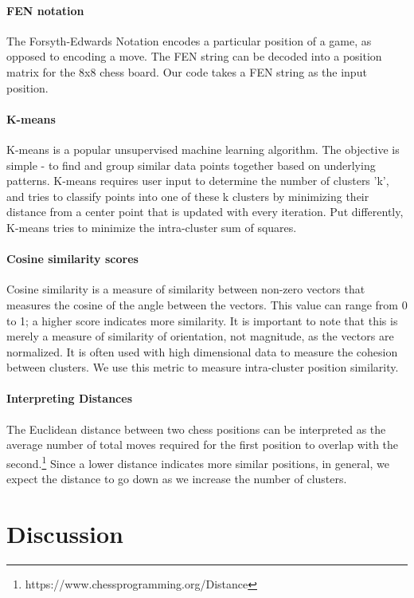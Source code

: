 \documentclass{article}
\begin{document}
\paragraph{FEN notation} The Forsyth-Edwards Notation encodes a particular position of a game, as opposed to encoding a move. The FEN string can be decoded into a position matrix for the 8x8 chess board. Our code takes a FEN string as the input position.

\paragraph{K-means} K-means is a popular unsupervised machine learning algorithm. The objective is simple - to find and group similar data points together based on underlying patterns. K-means requires user input to determine the number of clusters 'k', and tries to classify points into one of these k clusters by minimizing their distance from a center point that is updated with every iteration. Put differently, K-means tries to minimize the intra-cluster sum of squares.

\paragraph{Cosine similarity scores} Cosine similarity is a measure of similarity between non-zero vectors that measures the cosine of the angle between the vectors. This value can range from 0 to 1; a higher score indicates more similarity. It is important to note that this is merely a measure of similarity of orientation, not magnitude, as the vectors are normalized. It is often used with high dimensional data to measure the cohesion between clusters. We use this metric to measure intra-cluster position similarity.

\paragraph{Interpreting Distances} The Euclidean distance between two chess positions can be interpreted as the average number of total moves required for the first position to overlap with the second.\footnote{https://www.chessprogramming.org/Distance} Since a lower distance indicates more similar positions, in general, we expect the distance to go down as we increase the number of clusters.


\section{Discussion}
\end{document}
